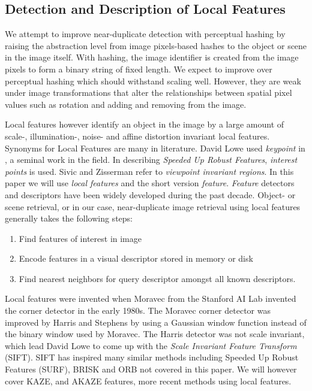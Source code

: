 \documentclass[english,12pt,a4paper,pdftex,elec,utf8, table]{aaltothesis}
\begin{document}
\subsection{Detection and Description of Local Features}
We attempt to improve near-duplicate detection with perceptual hashing by raising the abstraction level from image pixels-based hashes to the object or scene in the image itself. With hashing, the image identifier is created from the image pixels to form a binary string of fixed length. We expect to improve over perceptual hashing which should withstand scaling well. However, they are weak under image transformations that alter the relationships between spatial pixel values such as rotation and adding and removing from the image.

Local features however identify an object in the image by a large amount of scale-, illumination-, noise- and affine distortion invariant local features. Synonyms for Local Features are many in literature. David Lowe used \emph{keypoint} in \cite{Lowe2004}, a seminal work in the field. In describing \emph{Speeded Up Robust Features}, \emph{interest points} is used. Sivic and Zisserman refer to \emph{viewpoint invariant regions}. In this paper we will use \emph{local features} and the short version \emph{feature}. \emph{Feature} detectors and descriptors have been widely developed during the past decade. Object- or scene retrieval, or in our case, near-duplicate image retrieval using local features generally takes the following steps:

\begin{enumerate}
\item Find features of interest in image
\item Encode features in a visual descriptor stored in memory or disk
\item Find nearest neighbors for query descriptor amongst all known descriptors.
\end{enumerate}

Local features were invented when Moravec \cite{Moravec1981} from the Stanford AI Lab invented the corner detector in the early 1980s. The Moravec corner detector was improved by Harris and Stephens \cite{Harris1988} by using a Gaussian window function instead of the binary window used by Moravec. The Harris detector was not scale invariant, which lead David Lowe to come up with the \emph{Scale Invariant Feature Transform} (SIFT). SIFT has inspired many similar methods including Speeded Up Robust Features (SURF), BRISK and ORB not covered in this paper. We will however cover KAZE, and AKAZE features, more recent methods using local features.
\end{document}
